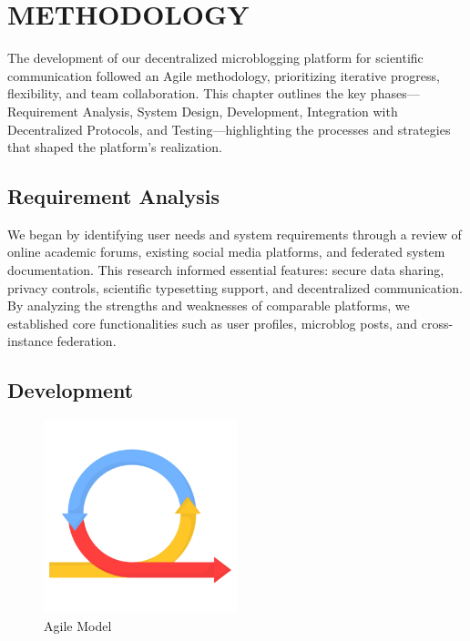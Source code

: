 \chapter{METHODOLOGY}

The development of our decentralized microblogging platform for scientific communication followed an Agile methodology, prioritizing iterative progress, flexibility, and team collaboration. This chapter outlines the key phases—Requirement Analysis, System Design, Development, Integration with Decentralized Protocols, and Testing—highlighting the processes and strategies that shaped the platform’s realization.

\section{Requirement Analysis}
\label{sec:requirements}

We began by identifying user needs and system requirements through a review of online academic forums, existing social media platforms, and federated system documentation. This research informed essential features: secure data sharing, privacy controls, scientific typesetting support, and decentralized communication. By analyzing the strengths and weaknesses of comparable platforms, we established core functionalities such as user profiles, microblog posts, and cross-instance federation.

\section{Development}
\label{sec:development}

\begin{figure}[h!]
    \centering
    \includegraphics[width=0.5\textwidth]{Graphics/agile.png}
    \caption{Agile Model}
\end{figure}

